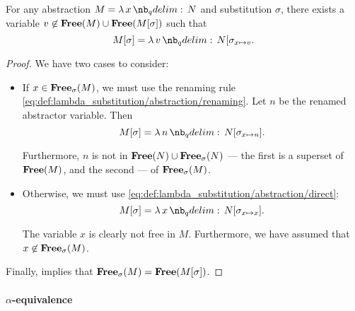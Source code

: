 \begin{proposition}\label{thm:lambda_substitution_single_rule}
  For any abstraction \( M = \qabs x N \) and substitution \( \sigma \), there exists a variable \( v \not\in \op*{Free}(M) \cup \op*{Free}(M[\sigma]) \) such that
  \begin{equation}\label{eq:thm:lambda_substitution_single_rule}
    M[\sigma] = \qabs v N[\sigma_{x \mapsto v}.
  \end{equation}
\end{proposition}
\begin{proof}
  We have two cases to consider:
  \begin{itemize}
    \item If \( x \in \op*{Free}_\sigma(M) \), we must use the renaming rule \eqref{eq:def:lambda_substitution/abstraction/renaming}. Let \( n \) be the renamed abstractor variable. Then
    \begin{equation*}
      M[\sigma] = \qabs n N[\sigma_{x \mapsto n}].
    \end{equation*}

    Furthermore, \( n \) is not in \( \op*{Free}(N) \cup \op*{Free}_\sigma(N) \) --- the first is a superset of \( \op*{Free}(M) \), and the second --- of \( \op*{Free}_\sigma(M) \).

    \item Otherwise, we must use \eqref{eq:def:lambda_substitution/abstraction/direct}:
    \begin{equation*}
      M[\sigma] = \qabs x N[\sigma_{x \mapsto x}].
    \end{equation*}

    The variable \( x \) is clearly not free in \( M \). Furthermore, we have assumed that \( x \not\in \op*{Free}_\sigma(M) \).
  \end{itemize}

  Finally,  implies that \( \op*{Free}_\sigma(M) = \op*{Free}(M[\sigma]) \).
\end{proof}

\paragraph{\( \alpha \)-equivalence}

